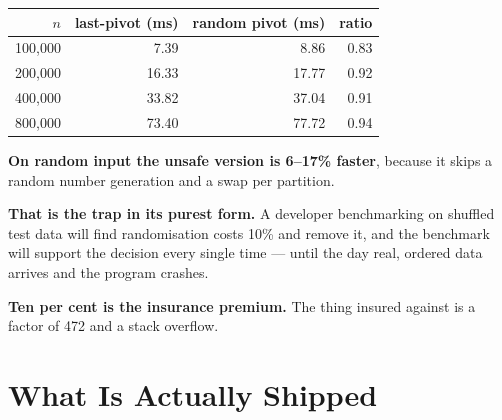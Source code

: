\begin{worked}
\begin{center}
\begin{tabular}{@{}rrrr@{}}
\toprule
\rowcolor{primary!15}
$n$ & last-pivot (ms) & random pivot (ms) & ratio \\
\midrule
100{,}000 &  7.39 &  8.86 & 0.83 \\
200{,}000 & 16.33 & 17.77 & 0.92 \\
400{,}000 & 33.82 & 37.04 & 0.91 \\
800{,}000 & 73.40 & 77.72 & 0.94 \\
\bottomrule
\end{tabular}
\end{center}

\smallskip
\textbf{On random input the unsafe version is 6--17\% faster}, because it skips
a random number generation and a swap per partition.

\smallskip
\textbf{That is the trap in its purest form.} A developer benchmarking on
shuffled test data will find randomisation costs 10\% and remove it, and the
benchmark will support the decision every single time --- until the day real,
ordered data arrives and the program crashes.

\smallskip
\textbf{Ten per cent is the insurance premium.} The thing insured against is a
factor of 472 and a stack overflow.
\end{worked}

\section{What Is Actually Shipped}

